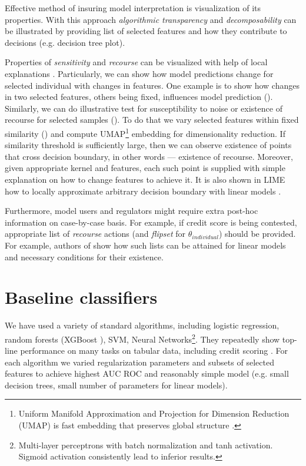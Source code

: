 \documentclass{article}
\begin{document}
Effective method of insuring model interpretation is visualization of its properties. With this approach \textit{algorithmic transparency} and \textit{decomposability} can be illustrated by providing list of selected features and how they contribute to decisions (e.g. decision tree plot).

Properties of \textit{sensitivity} and \textit{recourse} can be visualized with help of local explanations \cite{interpret, interpret-lin}. Particularly, we can show how model predictions change for selected individual with changes in features. One example is to show how changes in two selected features, others being fixed, influences model prediction (). Similarly, we can do illustrative test for susceptibility to noise or existence of recourse for selected samples (). To do that we vary selected features within fixed similarity () and compute UMAP\footnote{Uniform Manifold Approximation and Projection for Dimension Reduction (UMAP) is fast embedding that preserves global structure \cite{umap}.} embedding for dimensionality reduction. If similarity threshold is sufficiently large, then we can observe existence of points that cross decision boundary, in other words --- existence of recourse. Moreover, given appropriate kernel and features, each such point is supplied with simple explanation on how to change features to achieve it. It is also shown in LIME how to locally approximate arbitrary decision boundary with linear models \cite{interpret-lin}.

Furthermore, model users and regulators might require extra post-hoc information on case-by-case basis. For example, if credit score is being contested, appropriate list of \textit{recourse} actions (and \textit{flipset} for $\theta_{individual}$) should be provided. For example, authors of \cite{credit-recourse} show how such lists can be attained for linear models and necessary conditions for their existence.

\section{Baseline classifiers}
We have used a variety of standard algorithms, including logistic regression, random forests (XGBoost \cite{xgboost}), SVM, Neural Networks\footnote{Multi-layer perceptrons with batch normalization and tanh activation. Sigmoid activation consistently lead to inferior results.}. They repeatedly show top-line performance on many tasks on tabular data, including credit scoring \cite{credit1, credit2, credit4, credit5}. For each algorithm we varied regularization parameters and subsets of selected features to achieve highest AUC ROC and reasonably simple model (e.g. small decision trees, small number of parameters for linear models).
\end{document}
